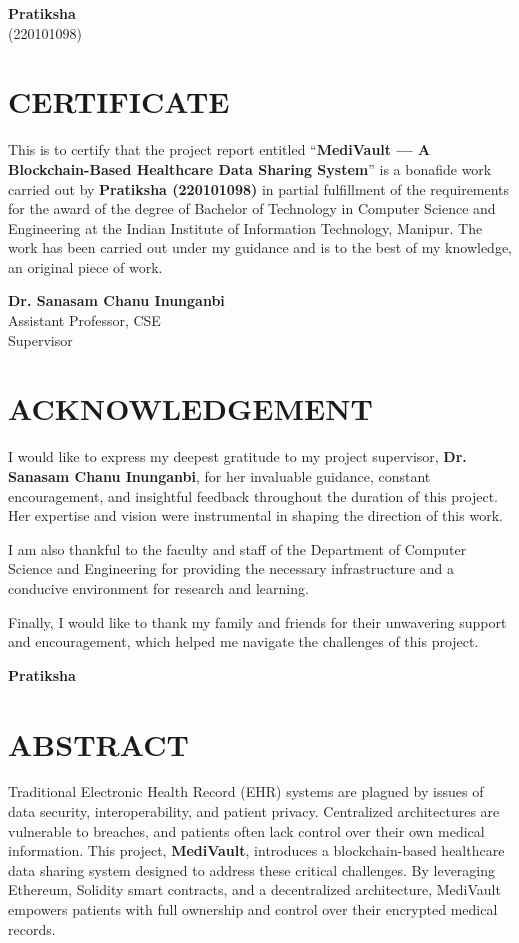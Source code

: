 \documentclass[12pt, a4paper]{report}
\begin{document}
\vspace{2cm}
\noindent
\textbf{Pratiksha} \\
(220101098)
\newpage

\chapter*{CERTIFICATE}
This is to certify that the project report entitled “\textbf{MediVault — A Blockchain-Based Healthcare Data Sharing System}” is a bonafide work carried out by \textbf{Pratiksha (220101098)} in partial fulfillment of the requirements for the award of the degree of Bachelor of Technology in Computer Science and Engineering at the Indian Institute of Information Technology, Manipur. The work has been carried out under my guidance and is to the best of my knowledge, an original piece of work.

\vspace{2cm}
\noindent
\textbf{Dr. Sanasam Chanu Inunganbi} \\
Assistant Professor, CSE \\
Supervisor
\newpage

\chapter*{ACKNOWLEDGEMENT}
I would like to express my deepest gratitude to my project supervisor, \textbf{Dr. Sanasam Chanu Inunganbi}, for her invaluable guidance, constant encouragement, and insightful feedback throughout the duration of this project. Her expertise and vision were instrumental in shaping the direction of this work.

I am also thankful to the faculty and staff of the Department of Computer Science and Engineering for providing the necessary infrastructure and a conducive environment for research and learning.

Finally, I would like to thank my family and friends for their unwavering support and encouragement, which helped me navigate the challenges of this project.

\vspace{2cm}
\noindent
\textbf{Pratiksha}
\newpage

\chapter*{ABSTRACT}
Traditional Electronic Health Record (EHR) systems are plagued by issues of data security, interoperability, and patient privacy. Centralized architectures are vulnerable to breaches, and patients often lack control over their own medical information. This project, \textbf{MediVault}, introduces a blockchain-based healthcare data sharing system designed to address these critical challenges. By leveraging Ethereum, Solidity smart contracts, and a decentralized architecture, MediVault empowers patients with full ownership and control over their encrypted medical records.
\end{document}
